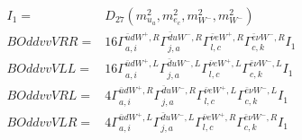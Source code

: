 \documentclass[A4,landscape]{article}
\begin{document}
\begin{align} 
I_1 = & D_{27}(m^2_{u_{{a}}}, m^2_{e_{{c}}}, m^2_{W^-}, m^2_{W^-}) \\ 
  BOddvvVRR= & 16  \Gamma^{\bar{u}d W^+,R}_{a, i} \Gamma^{\bar{d}u W^- ,R}_{j, a} \Gamma^{\bar{\nu}e W^+,R}_{l, c} \Gamma^{\bar{e}\nu W^- ,R}_{c, k} I_1 \\ 
  BOddvvVLL= & 16  \Gamma^{\bar{u}d W^+,L}_{a, i} \Gamma^{\bar{d}u W^- ,L}_{j, a} \Gamma^{\bar{\nu}e W^+,L}_{l, c} \Gamma^{\bar{e}\nu W^- ,L}_{c, k} I_1 \\ 
  BOddvvVRL= & 4  \Gamma^{\bar{u}d W^+,R}_{a, i} \Gamma^{\bar{d}u W^- ,R}_{j, a} \Gamma^{\bar{\nu}e W^+,L}_{l, c} \Gamma^{\bar{e}\nu W^- ,L}_{c, k} I_1 \\ 
  BOddvvVLR= & 4  \Gamma^{\bar{u}d W^+,L}_{a, i} \Gamma^{\bar{d}u W^- ,L}_{j, a} \Gamma^{\bar{\nu}e W^+,R}_{l, c} \Gamma^{\bar{e}\nu W^- ,R}_{c, k} I_1 \\ 
\end{align} 
\end{document}
